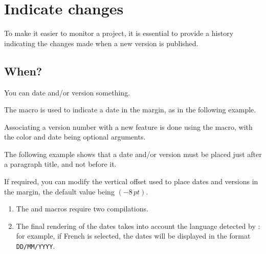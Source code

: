 \documentclass{tutodoc}
\begin{document}
\section{Indicate changes}
\label{tutodoc-changes}

To make it easier to monitor a project, it is essential to provide a history indicating the changes made when a new version is published.



\subsection{When?}

You can date and/or version something.


\begin{tdocexa}
    The  macro is used to indicate a date in the margin, as in the following example.

\end{tdocexa}


\begin{tdocexa}
    Associating a version number with a new feature is done using the  macro, with the color and date being optional arguments.

\end{tdocexa}


\begin{tdocexa}
	The following example shows that a date and/or version must be placed just after a paragraph title, and not before it.

\end{tdocexa}


\begin{tdocexa}
	If required, you can modify the vertical offset used to place dates and versions in the margin, the default value being $(-8\,\mathit{pt})$.

\end{tdocexa}


\begin{tdocimp}
    \begin{enumerate}[wide]
        \item The  and  macros require two compilations.

        \item The final rendering of the dates takes into account the language detected by \thisproj{}: for example, if French is selected, the dates will be displayed in the format \texttt{DD/MM/YYYY}.
    \end{enumerate}
\end{tdocimp}
\end{document}
